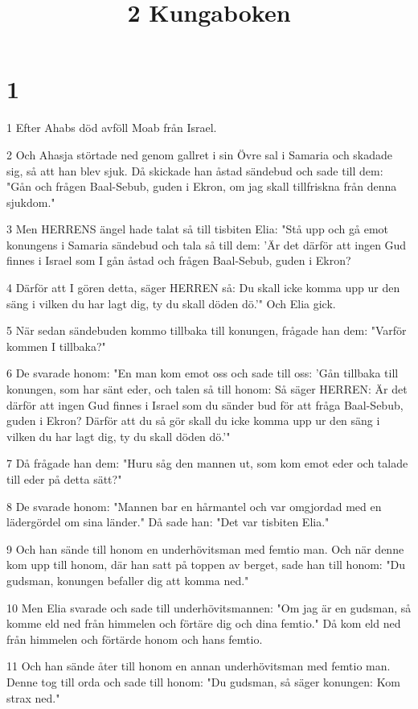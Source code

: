 

\title{2 Kungaboken}


\chapter{1}

\par 1 Efter Ahabs död avföll Moab från Israel.
\par 2 Och Ahasja störtade ned genom gallret i sin Övre sal i Samaria och skadade sig, så att han blev sjuk. Då skickade han åstad sändebud och sade till dem: "Gån och frågen Baal-Sebub, guden i Ekron, om jag skall tillfriskna från denna sjukdom."
\par 3 Men HERRENS ängel hade talat så till tisbiten Elia: "Stå upp och gå emot konungens i Samaria sändebud och tala så till dem: 'Är det därför att ingen Gud finnes i Israel som I gån åstad och frågen Baal-Sebub, guden i Ekron?
\par 4 Därför att I gören detta, säger HERREN så: Du skall icke komma upp ur den säng i vilken du har lagt dig, ty du skall döden dö.'" Och Elia gick.
\par 5 När sedan sändebuden kommo tillbaka till konungen, frågade han dem: "Varför kommen I tillbaka?"
\par 6 De svarade honom: "En man kom emot oss och sade till oss: 'Gån tillbaka till konungen, som har sänt eder, och talen så till honom: Så säger HERREN: Är det därför att ingen Gud finnes i Israel som du sänder bud för att fråga Baal-Sebub, guden i Ekron? Därför att du så gör skall du icke komma upp ur den säng i vilken du har lagt dig, ty du skall döden dö.'"
\par 7 Då frågade han dem: "Huru såg den mannen ut, som kom emot eder och talade till eder på detta sätt?"
\par 8 De svarade honom: "Mannen bar en hårmantel och var omgjordad med en lädergördel om sina länder." Då sade han: "Det var tisbiten Elia."
\par 9 Och han sände till honom en underhövitsman med femtio man. Och när denne kom upp till honom, där han satt på toppen av berget, sade han till honom: "Du gudsman, konungen befaller dig att komma ned."
\par 10 Men Elia svarade och sade till underhövitsmannen: "Om jag är en gudsman, så komme eld ned från himmelen och förtäre dig och dina femtio." Då kom eld ned från himmelen och förtärde honom och hans femtio.
\par 11 Och han sände åter till honom en annan underhövitsman med femtio man. Denne tog till orda och sade till honom: "Du gudsman, så säger konungen: Kom strax ned."
